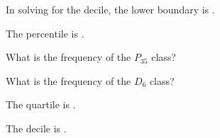 \begin{questions}
\question In solving for the  decile, the lower boundary is \blank.
\begin{multicols}{4}
\begin{choices} 
\end{choices}
\end{multicols}

\question The  percentile is \blank.  
\begin{multicols}{4}
\begin{choices} 
\end{choices}
\end{multicols}


\question What is the frequency of the $P_{35}$ class? 
\begin{multicols}{4}
\begin{choices} 
\end{choices}
\end{multicols}

\question What is the frequency of the $D_{6}$ class? 
\begin{multicols}{4}
\begin{choices} 
\end{choices}
\end{multicols}

\question The  quartile is \blank.  
\begin{multicols}{4}
\begin{choices} 
\end{choices}
\end{multicols}


\question The  decile is \blank.  
\begin{multicols}{4}
\begin{choices} 
\end{choices}
\end{multicols}










\end{questions}

